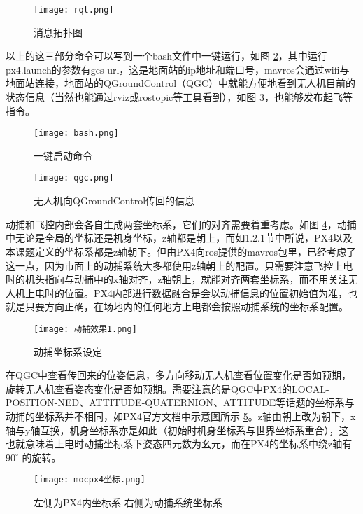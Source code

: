 \begin{figure}[!h]
  \centering
  \texttt{[image: rqt.png]}
  \caption{消息拓扑图}
  \label{rqt}
\end{figure}

以上的这三部分命令可以写到一个bash文件中一键运行，如图 \ref{一键}，其中运行px4.launch的参数有gcs-url，这是地面站的ip地址和端口号，mavros会通过wifi与地面站连接，地面站的QGroundControl（QGC）中就能方便地看到无人机目前的状态信息（当然也能通过rviz或rostopic等工具看到），如图 \ref{qgc}，也能够发布起飞等指令。


\begin{figure}[!h]
  \centering
  \texttt{[image: bash.png]}
  \caption{一键启动命令}
  \label{一键}
\end{figure}

\begin{figure}[!h]
  \centering
  \texttt{[image: qgc.png]}
  \caption{无人机向QGroundControl传回的信息}
  \label{qgc}
\end{figure}

动捕和飞控内部会各自生成两套坐标系，它们的对齐需要着重考虑。如图 \ref{动捕效果}，动捕中无论是全局的坐标还是机身坐标，z轴都是朝上，而如1.2.1节中所说，PX4以及本课题定义的坐标系都是z轴朝下。但由PX4向ros提供的mavros包里，已经考虑了这一点，因为市面上的动捕系统大多都使用z轴朝上的配置。只需要注意飞控上电时的机头指向与动捕中的x轴对齐，z轴朝上，就能对齐两套坐标系\cite{px4moc}，而不用关注无人机上电时的位置。PX4内部进行数据融合是会以动捕信息的位置初始值为准，也就是只要方向正确，在场地内的任何地方上电都会按照动捕系统的坐标系配置。

\newpage

\begin{figure}[!h]
  \centering
  \texttt{[image: 动捕效果1.png]}
  \caption{动捕坐标系设定}
  \label{动捕效果}
\end{figure}

在QGC中查看传回来的位姿信息，多方向移动无人机查看位置变化是否如预期，旋转无人机查看姿态变化是否如预期。需要注意的是QGC中PX4的LOCAL-POSITION-NED、ATTITUDE-QUATERNION、ATTITUDE等话题的坐标系与动捕的坐标系并不相同，如PX4官方文档\cite{px4moc}中示意图所示 \ref{mocpx4}。z轴由朝上改为朝下，x轴与y轴互换，机身坐标系亦是如此（初始时机身坐标系与世界坐标系重合），这也就意味着上电时动捕坐标系下姿态四元数为幺元，而在PX4的坐标系中绕z轴有$90  ^{\circ}$ 的旋转。

\begin{figure}[!h]
  \centering
  \texttt{[image: mocpx4坐标.png]}
  \caption{左侧为PX4内坐标系 右侧为动捕系统坐标系}
  \label{mocpx4}
\end{figure}

